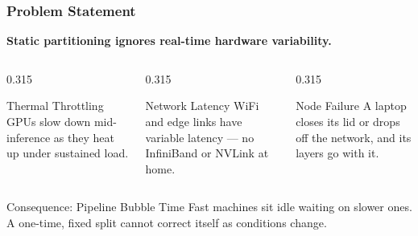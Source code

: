 \documentclass[aspectratio=169,11pt]{beamer}
\begin{document}
\begin{frame}
  \frametitle{Problem Statement}
  \vspace{0.4em}
  \textbf{Static partitioning ignores real-time hardware variability.}
  \vspace{0.9em}
  \begin{columns}[T]
  \begin{column}{0.315\textwidth}
    \begin{block}{Thermal Throttling}
      \small GPUs slow down mid-inference as they heat up under sustained load.
    \end{block}
  \end{column}
  \begin{column}{0.315\textwidth}
    \begin{block}{Network Latency}
      \small WiFi and edge links have variable latency --- no InfiniBand or
      NVLink at home.
    \end{block}
  \end{column}
  \begin{column}{0.315\textwidth}
    \begin{block}{Node Failure}
      \small A laptop closes its lid or drops off the network, and its layers
      go with it.
    \end{block}
  \end{column}
  \end{columns}
  \vfill
  \begin{alertblock}{Consequence: Pipeline Bubble Time}
    Fast machines sit idle waiting on slower ones. A one-time, fixed split
    cannot correct itself as conditions change.
  \end{alertblock}
  \vspace{0.6em}
\end{frame}
\end{document}
